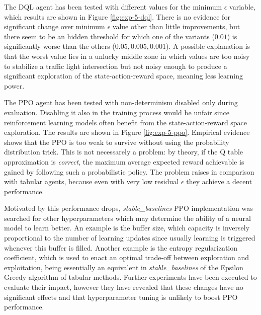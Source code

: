 The DQL agent has been tested with different values for the minimum $\epsilon$ variable, which results are shown in Figure \ref{fig:exp-5-dql}. There is no evidence for significant change over minimum $\epsilon$ value other than little improvements, but there seem to be an hidden threshold for which one of the variants ($0.01$) is significantly worse than the others ($0.05, 0.005, 0.001$). A possible explanation is that the worst value lies in a unlucky middle zone in which values are too noisy to stabilize a traffic light intersection but not noisy enough to produce a significant exploration of the state-action-reward space, meaning less learning power.

The PPO agent has been tested with non-determinism disabled only during evaluation. Disabling it also in the training process would be unfair since reinforcement learning models often benefit from the state-action-reward space exploration. The results are shown in Figure \ref{fig:exp-5-ppo}. Empirical evidence shows that the PPO is too weak to survive without using the probability distribution trick. This is not necessarely a problem: by theory, if the Q table approximation is \textit{correct}, the maximum average expected reward achievable is gained by following such a probabilistic policy. The problem raises in comparison with tabular agents, because even with very low residual $\epsilon$ they achieve a decent performance.

Motivated by this performance drops, \textit{stable\_baselines} PPO implementation was searched for other hyperparameters which may determine the ability of a neural model to learn better.
An example is the buffer size, which capacity is inversely proportional to the number of learning updates since usually learning is triggered whenever this buffer is filled.
Another example is the entropy regularization coefficient, which is used to enact an optimal trade-off between exploration and exploitation, being essentially an equivalent in \textit{stable\_baselines} of the Epsilon Greedy algorithm of tabular methods.
Further experiments have been executed to evaluate their impact, however they have revealed that these changes have no significant effects and that hyperparameter tuning is unlikely to boost PPO performance.



